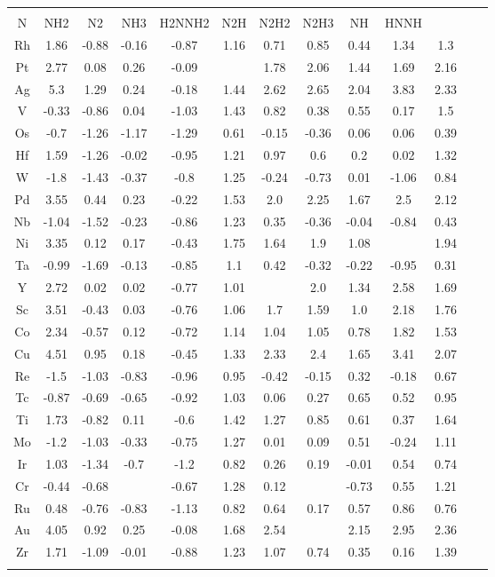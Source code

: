 \begin{center}
\begin{tabular}{| c | c | c | c | c | c | c | c | c | c | c | c | c |}
\hline\\
N & NH2 & N2 & NH3 & H2NNH2 & N2H & N2H2 & N2H3 & NH & HNNH & \hline
\\
Rh & 1.86 & -0.88 & -0.16 & -0.87 & 1.16 & 0.71 & 0.85 & 0.44 & 1.34 & 1.3 \\
Pt & 2.77 & 0.08 & 0.26 & -0.09 &  & 1.78 & 2.06 & 1.44 & 1.69 & 2.16 \\
Ag & 5.3 & 1.29 & 0.24 & -0.18 & 1.44 & 2.62 & 2.65 & 2.04 & 3.83 & 2.33 \\
V & -0.33 & -0.86 & 0.04 & -1.03 & 1.43 & 0.82 & 0.38 & 0.55 & 0.17 & 1.5 \\
Os & -0.7 & -1.26 & -1.17 & -1.29 & 0.61 & -0.15 & -0.36 & 0.06 & 0.06 & 0.39 \\
Hf & 1.59 & -1.26 & -0.02 & -0.95 & 1.21 & 0.97 & 0.6 & 0.2 & 0.02 & 1.32 \\
W & -1.8 & -1.43 & -0.37 & -0.8 & 1.25 & -0.24 & -0.73 & 0.01 & -1.06 & 0.84 \\
Pd & 3.55 & 0.44 & 0.23 & -0.22 & 1.53 & 2.0 & 2.25 & 1.67 & 2.5 & 2.12 \\
Nb & -1.04 & -1.52 & -0.23 & -0.86 & 1.23 & 0.35 & -0.36 & -0.04 & -0.84 & 0.43 \\
Ni & 3.35 & 0.12 & 0.17 & -0.43 & 1.75 & 1.64 & 1.9 & 1.08 &  & 1.94 \\
Ta & -0.99 & -1.69 & -0.13 & -0.85 & 1.1 & 0.42 & -0.32 & -0.22 & -0.95 & 0.31 \\
Y & 2.72 & 0.02 & 0.02 & -0.77 & 1.01 &  & 2.0 & 1.34 & 2.58 & 1.69 \\
Sc & 3.51 & -0.43 & 0.03 & -0.76 & 1.06 & 1.7 & 1.59 & 1.0 & 2.18 & 1.76 \\
Co & 2.34 & -0.57 & 0.12 & -0.72 & 1.14 & 1.04 & 1.05 & 0.78 & 1.82 & 1.53 \\
Cu & 4.51 & 0.95 & 0.18 & -0.45 & 1.33 & 2.33 & 2.4 & 1.65 & 3.41 & 2.07 \\
Re & -1.5 & -1.03 & -0.83 & -0.96 & 0.95 & -0.42 & -0.15 & 0.32 & -0.18 & 0.67 \\
Tc & -0.87 & -0.69 & -0.65 & -0.92 & 1.03 & 0.06 & 0.27 & 0.65 & 0.52 & 0.95 \\
Ti & 1.73 & -0.82 & 0.11 & -0.6 & 1.42 & 1.27 & 0.85 & 0.61 & 0.37 & 1.64 \\
Mo & -1.2 & -1.03 & -0.33 & -0.75 & 1.27 & 0.01 & 0.09 & 0.51 & -0.24 & 1.11 \\
Ir & 1.03 & -1.34 & -0.7 & -1.2 & 0.82 & 0.26 & 0.19 & -0.01 & 0.54 & 0.74 \\
Cr & -0.44 & -0.68 &  & -0.67 & 1.28 & 0.12 &  & -0.73 & 0.55 & 1.21 \\
Ru & 0.48 & -0.76 & -0.83 & -1.13 & 0.82 & 0.64 & 0.17 & 0.57 & 0.86 & 0.76 \\
Au & 4.05 & 0.92 & 0.25 & -0.08 & 1.68 & 2.54 &  & 2.15 & 2.95 & 2.36 \\
Zr & 1.71 & -1.09 & -0.01 & -0.88 & 1.23 & 1.07 & 0.74 & 0.35 & 0.16 & 1.39 \\
\hline\\
\end{tabular}
\end{center}